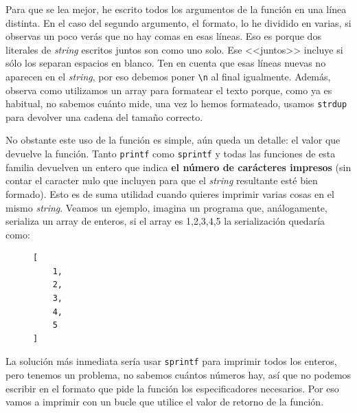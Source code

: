 \documentclass[a4paper]{article}
\begin{document}
Para que se lea mejor, he escrito todos los argumentos de la función en una
línea distinta. En el caso del segundo argumento, el formato, lo he dividido
en varias, si observas un poco verás que no hay comas en esas líneas. Eso es
porque dos literales de \textit{string} escritos juntos son como uno solo. Ese
<<juntos>> incluye si sólo los separan espacios en blanco. Ten en cuenta que
esas líneas nuevas no aparecen en el \textit{string}, por eso debemos poner
\verb!\n! al final igualmente.
Además,
observa como utilizamos un array para formatear el texto porque, como ya es
habitual, no sabemos cuánto mide, una vez lo hemos formateado,
usamos \verb!strdup! para devolver una cadena del tamaño correcto.

No obstante este uso de la función es simple, aún queda un detalle: el valor que
devuelve la función. Tanto \verb!printf! como  \verb!sprintf! y todas las
funciones de esta familia devuelven un entero que indica
\textbf{el número de carácteres impresos}
(sin contar el caracter nulo que incluyen para que el \emph{string} resultante
esté bien formado).
Esto es de suma utilidad cuando quieres imprimir varias cosas en el mismo
\emph{string}. Veamos un ejemplo, imagina un programa que, análogamente,
serializa un array de enteros, si el array es {1,2,3,4,5} la serialización
quedaría como:

\begin{figure}[H]
\begin{verbatim}
[
    1,
    2,
    3,
    4,
    5
]
\end{verbatim}
\end{figure}
La solución más inmediata sería usar \verb!sprintf! para imprimir todos los
enteros, pero tenemos un problema, no sabemos cuántos números hay, así que
no podemos escribir en el formato que pide la función los especificadores
necesarios. Por eso vamos a imprimir con un bucle que utilice el valor
de retorno de la función.
\end{document}

